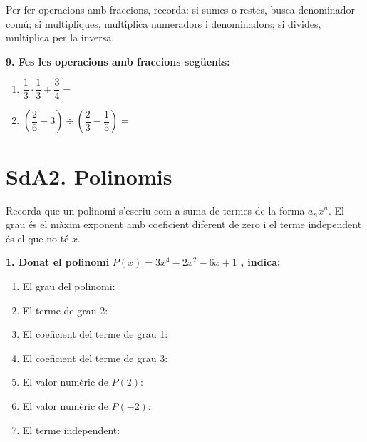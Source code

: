 \documentclass[12pt,a4paper]{article}
\begin{document}
\begin{capsula}
Per fer operacions amb fraccions, recorda: si sumes o restes, busca denominador comú; si multipliques, multiplica numeradors i denominadors; si divides, multiplica per la inversa.
\end{capsula}

\textbf{9. Fes les operacions amb fraccions següents:}
\begin{enumerate}[label=\alph*)]
    \item $\dfrac{1}{3}\cdot \dfrac{1}{3}+\dfrac{3}{4} =$ \vspace{1cm}
    \item $\left(\dfrac{2}{6}-3\right)\div \left(\dfrac{2}{3}-\dfrac{1}{5}\right) =$ \vspace{1.2cm}
\end{enumerate}

\section*{SdA2. Polinomis}

\begin{capsula}
Recorda que un polinomi s'escriu com a suma de termes de la forma $a_n x^n$. El grau és el màxim exponent amb coeficient diferent de zero i el terme independent és el que no té $x$.
\end{capsula}

\textbf{1. Donat el polinomi } $P(x)=3x^4-2x^2-6x+1$ \textbf{, indica:}
\begin{enumerate}[label=\alph*)]
    \item El grau del polinomi: \dotfill\vspace{0.4cm}
    \item El terme de grau 2: \dotfill\vspace{0.4cm}
    \item El coeficient del terme de grau 1: \dotfill\vspace{0.4cm}
    \item El coeficient del terme de grau 3: \dotfill\vspace{0.4cm}
    \item El valor numèric de $P(2):$ \dotfill\vspace{0.6cm}
    \item El valor numèric de $P(-2):$ \dotfill\vspace{0.6cm}
    \item El terme independent: \dotfill\vspace{0.4cm}
\end{enumerate}
\end{document}
